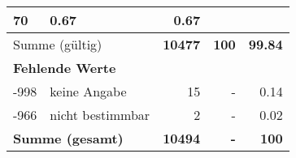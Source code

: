 \begin{longtable}{lXrrr}
       \num{70} &
       \num[round-mode=places,round-precision=2]{0.67} &
         \num[round-mode=places,round-precision=2]{0.67} \\
     \midrule
     \multicolumn{2}{l}{Summe (gültig)} &
       \textbf{\num{10477}} &
     \textbf{\num{100}} &
       \textbf{\num[round-mode=places,round-precision=2]{99.84}} \\
     \multicolumn{5}{l}{\textbf{Fehlende Werte}}\\
       -998 &
       keine Angabe &
         \num{15} &
        - &
         \num[round-mode=places,round-precision=2]{0.14} \\
       -966 &
       nicht bestimmbar &
         \num{2} &
        - &
         \num[round-mode=places,round-precision=2]{0.02} \\
     \midrule
     \multicolumn{2}{l}{\textbf{Summe (gesamt)}} &
          \textbf{\num{10494}} &
        \textbf{-} &
        \textbf{\num{100}} \\
     \bottomrule
     \end{longtable}
     
